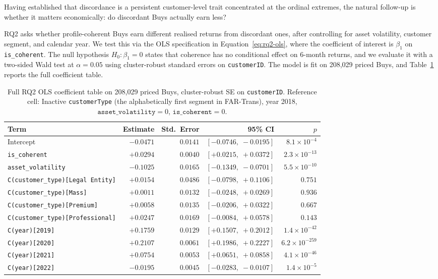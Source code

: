 Having established that discordance is a persistent customer-level trait concentrated at the ordinal extremes, the natural follow-up is whether it matters economically: do discordant Buys actually earn less?

RQ2 asks whether profile-coherent Buys earn different realised returns from discordant ones, after controlling for asset volatility, customer segment, and calendar year. We test this via the OLS specification in Equation~\ref{eq:rq2-ols}, where the coefficient of interest is $\beta_1$ on \texttt{is\_coherent}. The null hypothesis $H_0\colon \beta_1 = 0$ states that coherence has no conditional effect on 6-month returns, and we evaluate it with a two-sided Wald test at $\alpha = 0.05$ using cluster-robust standard errors on \texttt{customerID}. The model is fit on 208{,}029 priced Buys, and Table~\ref{tab:rq2-full} reports the full coefficient table.

\begin{table}[!t]
\centering
\small
\begin{tabular}{lrrrr}
\toprule
Term & Estimate & Std.\ Error & 95\% CI & $p$ \\
\midrule
Intercept                                & $-0.0471$ & $0.0141$ & $[-0.0746,\; -0.0195]$ & $8.1 \times 10^{-4}$ \\
\texttt{is\_coherent}                    & $+0.0294$ & $0.0040$ & $[+0.0215,\; +0.0372]$ & $2.3 \times 10^{-13}$ \\
\texttt{asset\_volatility}               & $-0.1025$ & $0.0165$ & $[-0.1349,\; -0.0701]$ & $5.5 \times 10^{-10}$ \\
\texttt{C(customer\_type)[Legal Entity]} & $+0.0154$ & $0.0486$ & $[-0.0798,\; +0.1106]$ & $0.751$ \\
\texttt{C(customer\_type)[Mass]}         & $+0.0011$ & $0.0132$ & $[-0.0248,\; +0.0269]$ & $0.936$ \\
\texttt{C(customer\_type)[Premium]}      & $+0.0058$ & $0.0135$ & $[-0.0206,\; +0.0322]$ & $0.667$ \\
\texttt{C(customer\_type)[Professional]} & $+0.0247$ & $0.0169$ & $[-0.0084,\; +0.0578]$ & $0.143$ \\
\texttt{C(year)[2019]}                   & $+0.1759$ & $0.0129$ & $[+0.1507,\; +0.2012]$ & $1.4 \times 10^{-42}$ \\
\texttt{C(year)[2020]}                   & $+0.2107$ & $0.0061$ & $[+0.1986,\; +0.2227]$ & $6.2 \times 10^{-259}$ \\
\texttt{C(year)[2021]}                   & $+0.0754$ & $0.0053$ & $[+0.0651,\; +0.0858]$ & $4.1 \times 10^{-46}$ \\
\texttt{C(year)[2022]}                   & $-0.0195$ & $0.0045$ & $[-0.0283,\; -0.0107]$ & $1.4 \times 10^{-5}$ \\
\bottomrule
\end{tabular}
\caption{Full RQ2 OLS coefficient table on 208{,}029 priced Buys, cluster-robust SE on \texttt{customerID}. Reference cell: Inactive \texttt{customerType} (the alphabetically first segment in FAR-Trans), year 2018, $\texttt{asset\_volatility} = 0$, $\texttt{is\_coherent} = 0$.}
\label{tab:rq2-full}
\end{table}

